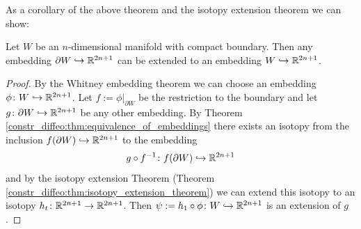As a corollary of the above theorem and the isotopy extension theorem we can show:

\begin{corollary}
    Let $W$ be an $n$-dimensional manifold with compact boundary. Then any embedding $\partial W \hookrightarrow \mathbb{R}^{2n+1}$ can be extended to an embedding $W \hookrightarrow \mathbb{R}^{2n+1}$.
\end{corollary}

\begin{proof}
    By the Whitney embedding theorem we can choose an embedding $\phi \colon W \hookrightarrow \mathbb{R}^{2n+1}$. Let $f := \phi|_{\partial W}$ be the restriction to the boundary and let $g \colon \partial W \hookrightarrow \mathbb{R}^{2n+1}$ be any other embedding. By Theorem \ref{constr_diffeo:thm:equivalence_of_embeddings} there exists an isotopy from the inclusion $f(\partial W) \hookrightarrow \mathbb{R}^{2n+1}$ to the embedding 
    \[
    g \circ f^{-1} \colon f(\partial W) \hookrightarrow \mathbb{R}^{2n+1}
    \]
    and by the isotopy extension Theorem (Theorem \ref{constr_diffeo:thm:isotopy_extension_theorem}) we can extend this isotopy to an isotopy $h_t \colon \mathbb{R}^{2n+1} \to \mathbb{R}^{2n+1}$. Then $\psi := h_1 \circ \phi \colon W \hookrightarrow \mathbb{R}^{2n+1}$ is an extension of $g$.
\end{proof}
